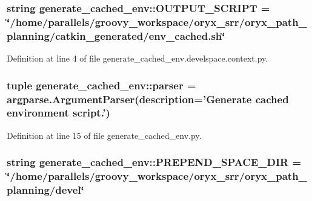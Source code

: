 \subsubsection[{\-O\-U\-T\-P\-U\-T\-\_\-\-S\-C\-R\-I\-P\-T}]{\setlength{\rightskip}{0pt plus 5cm}string {\bf generate\-\_\-cached\-\_\-env\-::\-O\-U\-T\-P\-U\-T\-\_\-\-S\-C\-R\-I\-P\-T} = \char`\"{}/home/parallels/groovy\-\_\-workspace/oryx\-\_\-srr/oryx\-\_\-path\-\_\-planning/catkin\-\_\-generated/env\-\_\-cached.\-sh\char`\"{}}\label{namespacegenerate__cached__env_a2b990820565b508f09bdf4b646b41248}


\-Definition at line 4 of file generate\-\_\-cached\-\_\-env.\-develspace.\-context.\-py.

\subsubsection[{parser}]{\setlength{\rightskip}{0pt plus 5cm}tuple {\bf generate\-\_\-cached\-\_\-env\-::parser} = argparse.\-Argument\-Parser(description='\-Generate cached environment script.')}\label{namespacegenerate__cached__env_adc7207f2d17ca27671a8a3a61ddbe3b1}


\-Definition at line 15 of file generate\-\_\-cached\-\_\-env.\-py.

\subsubsection[{\-P\-R\-E\-P\-E\-N\-D\-\_\-\-S\-P\-A\-C\-E\-\_\-\-D\-I\-R}]{\setlength{\rightskip}{0pt plus 5cm}string {\bf generate\-\_\-cached\-\_\-env\-::\-P\-R\-E\-P\-E\-N\-D\-\_\-\-S\-P\-A\-C\-E\-\_\-\-D\-I\-R} = \char`\"{}/home/parallels/groovy\-\_\-workspace/oryx\-\_\-srr/oryx\-\_\-path\-\_\-planning/devel\char`\"{}}\label{namespacegenerate__cached__env_adf2800a5704edaa58431a0f1c5704a4f}


